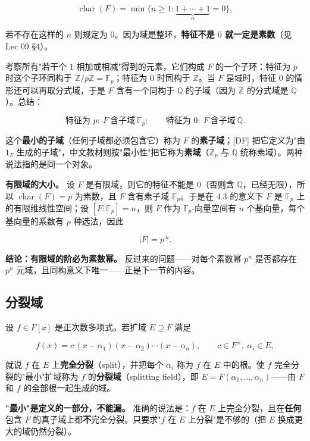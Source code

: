 \[
\operatorname{char}(F)=\min\{n\ge1:\underbrace{1+\cdots+1}_{n}=0\},
\]

若不存在这样的 $n$ 则规定为 $0$。因为域是整环，\textbf{特征不是 $0$ 就一定是素数}（见 Lec 09 §4）。

考察所有"若干个 $1$ 相加或相减"得到的元素，它们构成 $F$ 的一个子环：特征为 $p$ 时这个子环同构于 $\mathbb Z/p\mathbb Z=\mathbb F_p$；特征为 $0$ 时同构于 $\mathbb Z$。当 $F$ 是域时，特征 $0$ 的情形还可以再取分式域，于是 $F$ 含有一个同构于 $\mathbb Q$ 的子域（因为 $\mathbb Z$ 的分式域是 $\mathbb Q$）。总结：

\[
\text{特征为 }p:\ F\ \text{含子域}\ \mathbb F_p;\qquad
\text{特征为 }0:\ F\ \text{含子域}\ \mathbb Q .
\]

这个\textbf{最小的子域}（任何子域都必须包含它）称为 $F$ 的\textbf{素子域}；[DF] 把它定义为"由 $1_F$ 生成的子域"，中文教材则按"最小性"把它称为\textbf{素域}（$\mathbb Z_p$ 与 $\mathbb Q$ 统称素域）。两种说法指的是同一个对象。

\textbf{有限域的大小。} 设 $F$ 是有限域，则它的特征不能是 $0$（否则含 $\mathbb Q$，已经无限），所以 $\operatorname{char}(F)=p$ 为素数，且 $F$ 含有素子域 $\mathbb F_p$。于是在 4.3 的意义下 $F$ 是 $\mathbb F_p$ 上的有限维线性空间；设 $[F:\mathbb F_p]=n$，则 $F$ 作为 $\mathbb F_p$-向量空间有 $n$ 个基向量，每个基向量的系数有 $p$ 种选法，因此

\[
|F|=p^{\,n}.
\]

\textbf{结论：有限域的阶必为素数幂。} 反过来的问题——对每个素数幂 $p^n$ 是否都存在 $p^n$ 元域，且同构意义下唯一——正是下一节的内容。

\subsection{分裂域}


设 $f\in F[x]$ 是正次数多项式。若扩域 $E\supseteq F$ 满足

\[
f(x)=c\,(x-\alpha_1)(x-\alpha_2)\cdots(x-\alpha_n),\qquad c\in F^\times,\ \alpha_i\in E,
\]

就说 $f$ 在 $E$ 上\textbf{完全分裂}（split），并把每个 $\alpha_i$ 称为 $f$ 在 $E$ 中的根。使 $f$ 完全分裂的"最小"扩域称为 $f$ 的\textbf{分裂域}（splitting field），即 $E=F(\alpha_1,\dots,\alpha_n)$——由 $F$ 和 $f$ 的全部根一起生成的域。

\textbf{"最小"是定义的一部分，不能漏。} 准确的说法是：$f$ 在 $E$ 上完全分裂，且在\textbf{任何}包含 $F$ 的真子域上都\textbf{不}完全分裂。只要求"$f$ 在 $E$ 上分裂"是不够的（把 $E$ 换成更大的域仍然分裂）。

